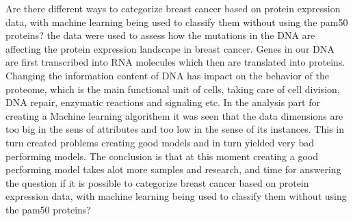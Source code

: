 Are there different ways to categorize breast cancer based on protein expression data, with machine learning being used to classify them without using the pam50 proteins?
the data were used to assess how the mutations in the DNA are affecting the protein expression landscape in breast cancer.
Genes in our DNA are first transcribed into RNA molecules which then are translated into proteins.
Changing the information content of DNA has impact on the behavior of the proteome, which is the main functional unit of cells, taking care of cell division, DNA repair, enzymatic reactions and signaling etc.
In the analysis part for creating a Machine learning algorithem it was seen that the data dimensions are too big in the sens of attributes and too low in the sense of its instances.
This in turn created problems creating good models and in turn yielded very bad performing models.
The conclusion is that at this moment creating a good performing model takes alot more samples and research, and time for answering the question if it is possible to categorize breast cancer based on protein expression data, with machine learning being used to classify them without using the pam50 proteins?

